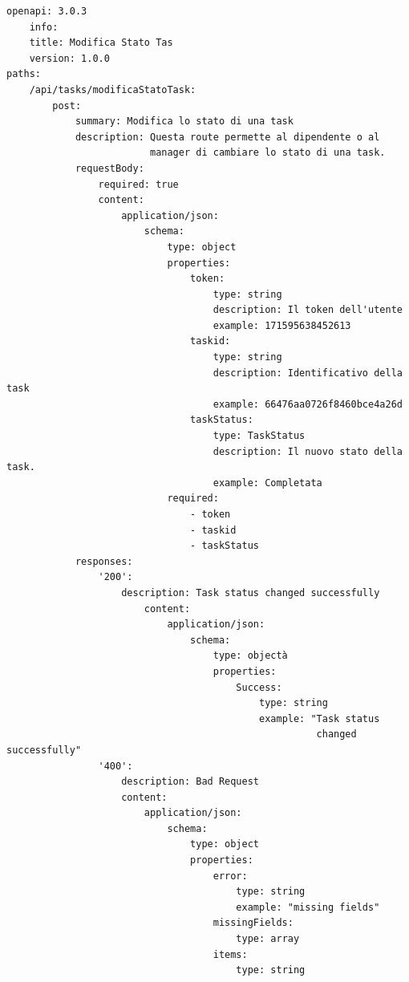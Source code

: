 \documentclass{report}
\begin{document}
\begin{verbatim}
openapi: 3.0.3
    info:
    title: Modifica Stato Tas
    version: 1.0.0
paths:
    /api/tasks/modificaStatoTask:
        post:
            summary: Modifica lo stato di una task
            description: Questa route permette al dipendente o al
                         manager di cambiare lo stato di una task.
            requestBody:
                required: true
                content:
                    application/json:
                        schema:
                            type: object
                            properties:
                                token:
                                    type: string
                                    description: Il token dell'utente
                                    example: 171595638452613
                                taskid:
                                    type: string
                                    description: Identificativo della task
                                    example: 66476aa0726f8460bce4a26d
                                taskStatus:
                                    type: TaskStatus
                                    description: Il nuovo stato della task.
                                    example: Completata
                            required:
                                - token
                                - taskid
                                - taskStatus
            responses:
                '200':
                    description: Task status changed successfully
                        content:
                            application/json:
                                schema:
                                    type: objectà
                                    properties:
                                        Success:
                                            type: string
                                            example: "Task status
                                                      changed successfully"
                '400':
                    description: Bad Request
                    content:
                        application/json:
                            schema:
                                type: object
                                properties:
                                    error:
                                        type: string
                                        example: "missing fields"
                                    missingFields:
                                        type: array
                                    items:
                                        type: string

\end{verbatim}
\end{document}

